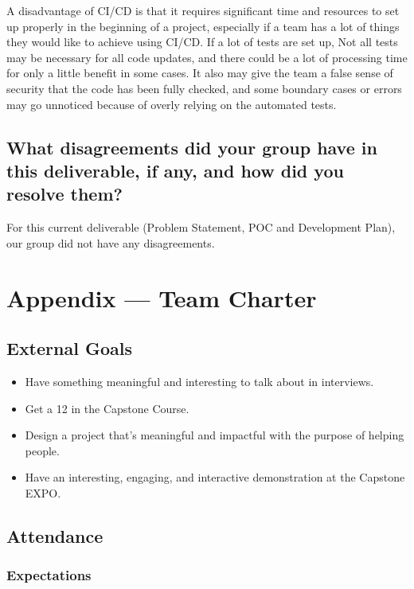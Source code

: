 \documentclass{article}
\begin{document}
A disadvantage of CI/CD is that it requires significant time and resources to set up properly in the beginning of a 
project, especially if a team has a lot of things they would like to achieve using CI/CD. If a lot of tests are set up, 
Not all tests may be necessary for all code updates, and there could be a lot of processing time for only a little 
benefit in some cases. It also may give the team a false sense of security that the code has been fully checked, 
and some boundary cases or errors may go unnoticed because of overly relying on the automated tests. 

\subsection*{What disagreements did your group have in this deliverable, if any, and how did you resolve them?}

For this current deliverable (Problem Statement, POC and Development Plan), our group did not have any disagreements.

\newpage{}

\section*{Appendix --- Team Charter}

\subsection*{External Goals}

\begin{itemize}
\item Have something meaningful and interesting to talk about in interviews.
\item Get a 12 in the Capstone Course.
\item Design a project that's meaningful and impactful with the purpose of helping people.
\item Have an interesting, engaging, and interactive demonstration at the Capstone EXPO.
\end{itemize}

\subsection*{Attendance}

\subsubsection*{Expectations}
\end{document}
